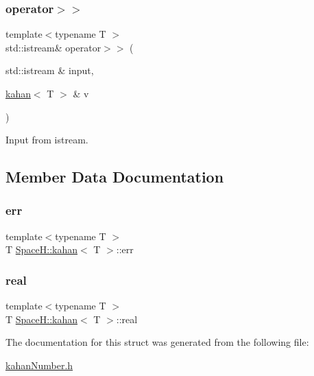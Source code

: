 \subsubsection{\texorpdfstring{operator$>$$>$}{operator>>}}
{\footnotesize\ttfamily template$<$typename T $>$ \\
std\+::istream\& operator$>$$>$ (\begin{DoxyParamCaption}\item[{std\+::istream \&}]{input,  }\item[{\mbox{\hyperlink{struct_space_h_1_1kahan}{kahan}}$<$ T $>$ \&}]{v }\end{DoxyParamCaption})\hspace{0.3cm}{\ttfamily [friend]}}



Input from istream. 



\subsection{Member Data Documentation}
\mbox{\label{struct_space_h_1_1kahan_abd8853c83c20e2eb13b602032a55bd2a}} 
\subsubsection{\texorpdfstring{err}{err}}
{\footnotesize\ttfamily template$<$typename T $>$ \\
T \mbox{\hyperlink{struct_space_h_1_1kahan}{Space\+H\+::kahan}}$<$ T $>$\+::err}

\mbox{\label{struct_space_h_1_1kahan_a34f95db4f173e2136fb49e679b6816be}} 
\subsubsection{\texorpdfstring{real}{real}}
{\footnotesize\ttfamily template$<$typename T $>$ \\
T \mbox{\hyperlink{struct_space_h_1_1kahan}{Space\+H\+::kahan}}$<$ T $>$\+::real}



The documentation for this struct was generated from the following file\+:\begin{DoxyCompactItemize}
\item 
\mbox{\hyperlink{kahan_number_8h}{kahan\+Number.\+h}}\end{DoxyCompactItemize}
